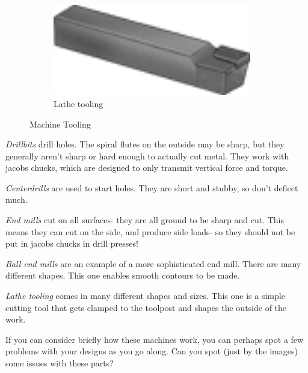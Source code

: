 \documentclass[10pt,letterpaper]{book}
\begin{document}
\begin{figure}[H]
\begin{subfigure}[b]{.19\linewidth}
		\includegraphics[width=0.95\textwidth]{imgs/lathetool.png}
		\caption{Lathe tooling}
	\end{subfigure}	
	
	\caption{Machine Tooling}
\end{figure}

 \begin{asparaenum}[a)]
 	\item \textit{Drillbits} drill holes. The spiral flutes on the outside may be sharp, but they generally aren't sharp or hard enough to actually cut metal. They work with jacobs chucks, which are designed to only transmit vertical force and torque.
 	\item \textit{Centerdrills} are used to start holes. They are short and stubby, so don't deflect much.
 	\item \textit{End mills} cut on all surfaces- they are all ground to be sharp and cut. This means they can cut on the side, and produce side loads- so they should not be put in jacobs chucks in drill presses!
 	\item \textit{Ball end mills} are an example of a more sophisticated end mill. There are many different shapes. This one enables smooth contours to be made.
 	\item \textit{Lathe tooling} comes in many different shapes and sizes. This one is a simple cutting tool that gets clamped to the toolpost and shapes the outside of the work.
 \end{asparaenum}
 
If you can consider briefly how these machines work, you can perhaps spot a few problems with your designs as you go along. Can you spot (just by the images) some issues with these parts?
 
\end{document}

